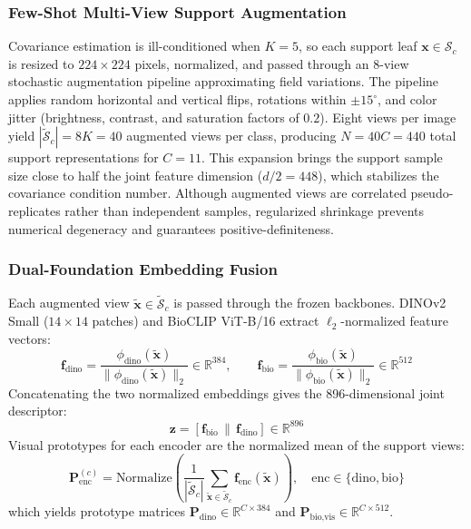 \documentclass[preprint,12pt]{elsarticle}
\begin{document}
\subsubsection{Few-Shot Multi-View Support Augmentation}
Covariance estimation is ill-conditioned when $K = 5$, so each support leaf $\mathbf{x} \in \mathcal{S}_c$ is resized to $224 \times 224$ pixels, normalized, and passed through an 8-view stochastic augmentation pipeline approximating field variations. The pipeline applies random horizontal and vertical flips, rotations within $\pm 15^\circ$, and color jitter (brightness, contrast, and saturation factors of $0.2$). Eight views per image yield $|\tilde{\mathcal{S}}_c| = 8K = 40$ augmented views per class, producing $N = 40C = 440$ total support representations for $C = 11$. This expansion brings the support sample size close to half the joint feature dimension ($d/2 = 448$), which stabilizes the covariance condition number. Although augmented views are correlated pseudo-replicates rather than independent samples, regularized shrinkage prevents numerical degeneracy and guarantees positive-definiteness.

\subsubsection{Dual-Foundation Embedding Fusion}
Each augmented view $\tilde{\mathbf{x}} \in \tilde{\mathcal{S}}_c$ is passed through the frozen backbones. DINOv2 Small ($14\times 14$ patches) \cite{oquab2023dinov2} and BioCLIP ViT-B/16 \cite{stevens2024bioclip} extract $\ell_2$-normalized feature vectors:
\begin{equation}
    \mathbf{f}_{\text{dino}} = \frac{\phi_{\text{dino}}(\tilde{\mathbf{x}})}{\|\phi_{\text{dino}}(\tilde{\mathbf{x}})\|_2} \in \mathbb{R}^{384}, \qquad
    \mathbf{f}_{\text{bio}} = \frac{\phi_{\text{bio}}(\tilde{\mathbf{x}})}{\|\phi_{\text{bio}}(\tilde{\mathbf{x}})\|_2} \in \mathbb{R}^{512}
\end{equation}
Concatenating the two normalized embeddings gives the 896-dimensional joint descriptor:
\begin{equation}
    \mathbf{z} = [\mathbf{f}_{\text{bio}} \,\|\, \mathbf{f}_{\text{dino}}] \in \mathbb{R}^{896}
\end{equation}
Visual prototypes for each encoder are the normalized mean of the support views:
\begin{equation}
    \mathbf{P}_{\text{enc}}^{(c)} = \text{Normalize}\left(\frac{1}{|\tilde{\mathcal{S}}_c|}\sum_{\tilde{\mathbf{x}} \in \tilde{\mathcal{S}}_c} \mathbf{f}_{\text{enc}}(\tilde{\mathbf{x}})\right), \quad \text{enc} \in \{\text{dino}, \text{bio}\}
\end{equation}
which yields prototype matrices $\mathbf{P}_{\text{dino}} \in \mathbb{R}^{C \times 384}$ and $\mathbf{P}_{\text{bio,vis}} \in \mathbb{R}^{C \times 512}$.
\end{document}
